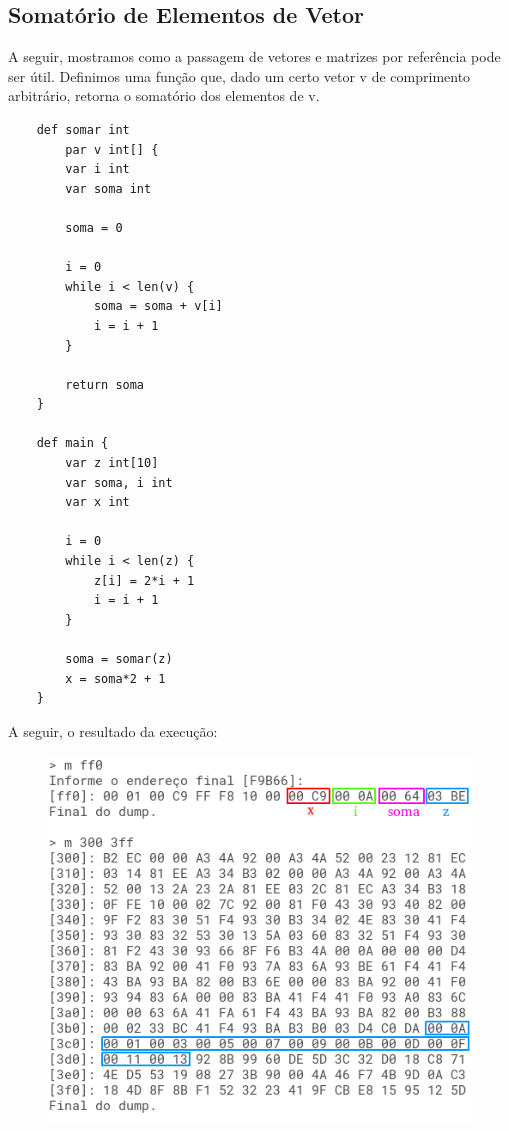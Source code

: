 \documentclass[a4paper,12pt]{report}
\begin{document}
    \subsection*{Somatório de Elementos de Vetor}

    A seguir, mostramos como a passagem de vetores e matrizes por referência pode ser útil. Definimos uma função que, dado um certo vetor v de comprimento arbitrário, retorna o somatório dos elementos de v.

    \begin{lstlisting}
    def somar int
        par v int[] {
        var i int
        var soma int

        soma = 0
        
        i = 0
        while i < len(v) {
            soma = soma + v[i]
            i = i + 1
        }
        
        return soma
    }

    def main {
        var z int[10]
        var soma, i int
        var x int
        
        i = 0
        while i < len(z) {
            z[i] = 2*i + 1
            i = i + 1
        }
        
        soma = somar(z)
        x = soma*2 + 1
    }
    \end{lstlisting}

    A seguir, o resultado da execução:

    \begin{figure}[h]
        \centering
        \includegraphics[scale=0.7]{soma_vetor}
    \end{figure}
\end{document}
